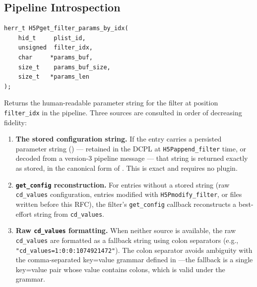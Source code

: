 \documentclass[../RFC-HDFG-2026-001.tex]{subfiles}
\begin{document}
\subsection{Pipeline Introspection}
\label{sec:introspection}

\begin{verbatim}
herr_t H5Pget_filter_params_by_idx(
    hid_t     plist_id,
    unsigned  filter_idx,
    char     *params_buf,
    size_t    params_buf_size,
    size_t   *params_len
);
\end{verbatim}

Returns the human-readable parameter string for the filter at position
\texttt{filter\_idx} in the pipeline.  Three sources are consulted in
order of decreasing fidelity:

\begin{enumerate}
\item \textbf{The stored configuration string.}  If the entry carries a
  persisted parameter string () ---
  retained in the DCPL at \texttt{H5Pappend\_filter} time, or decoded from
  a version-3 pipeline message --- that string is returned exactly as stored,
  in the canonical form of .  This
  is exact and requires no plugin.
\item \textbf{\texttt{get\_config} reconstruction.}  For entries without a
  stored string (raw \texttt{cd\_values} configuration, entries modified
  with \texttt{H5Pmodify\_filter}, or files written before this RFC), the
  filter's \texttt{get\_config} callback
  reconstructs a best-effort string from \texttt{cd\_values}.
\item \textbf{Raw \texttt{cd\_values} formatting.}  When neither source is
  available, the raw \texttt{cd\_values} are formatted as a fallback string
  using colon separators (e.g., \texttt{"cd\_values=1:0:0:1074921472"}).
  The colon separator avoids ambiguity with the comma-separated key=value
  grammar defined in ---the fallback is a
  single key=value pair whose value contains colons, which is valid under
  the grammar.
\end{enumerate}
\end{document}
